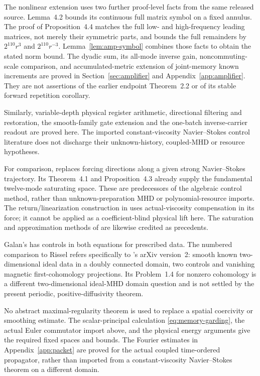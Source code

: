 \documentclass[11pt,a4paper]{amsart}
\theoremstyle{definition}
\theoremstyle{remark}
\numberwithin{equation}{section}
\begin{document}
The nonlinear extension uses two further proof-level facts from the same
released source. Lemma~4.2 bounds its continuous full matrix symbol on a
fixed annulus. The proof of Proposition~4.4 matches the full low- and
high-frequency leading matrices, not merely their symmetric parts, and
bounds the full remainders by $2^{110}r^3$ and $2^{110}r^{-3}$.
Lemma~\ref{lem:amp-symbol} combines those facts to obtain the stated norm
bound. The dyadic sum, its all-mode inverse gain, noncommuting-scale
comparison, and accumulated-metric extension of joint-memory known
increments are proved in Section~\ref{sec:amplifier} and
Appendix~\ref{app:amplifier}. They are not assertions of the earlier
endpoint Theorem~2.2 or of its stable forward repetition corollary.

Similarly, variable-depth physical register arithmetic, directional
filtering and restoration, the smooth-family gate extension and the
one-batch inverse-carrier readout are proved here. The imported
constant-viscosity Navier--Stokes control literature does not discharge
their unknown-history, coupled-MHD or resource hypotheses.

For comparison, \cite[Theorem~2.5]{Nersesyan2015} replaces forcing directions
along a given strong Navier--Stokes trajectory. Its Theorem~4.1 and
Proposition~4.3 already supply the fundamental twelve-mode saturating
space. These are predecessors of the algebraic control method, rather
than unknown-preparation MHD or polynomial-resource imports. The
return/linearization construction in \cite[Proposition~1.2]{Nersesyan21}
uses actual-viscosity compensation in its force; it cannot be applied as
a coefficient-blind physical lift here. The saturation and approximation
methods of \cite{AS2005,Shirikyan2006} are likewise credited as precedents.

Galan's \cite[Theorem~2.1]{Galan2011} has controls in both equations for
prescribed data. The numbered comparison to Rissel refers specifically
to \cite[Theorem~1.2]{Rissel}'s arXiv version~2: smooth known
two-dimensional ideal data in a doubly connected domain, two controls and
vanishing magnetic first-cohomology projections. Its Problem~1.4 for
nonzero cohomology is a different two-dimensional ideal-MHD domain question and is not
settled by the present periodic, positive-diffusivity theorem.

No abstract maximal-regularity theorem is used to replace a spatial
coercivity or smoothing estimate. The scalar-principal calculation
\eqref{eq:memory-garding}, the actual Euler commutator import above,
and the physical energy arguments give the required fixed spaces and
bounds. The Fourier estimates in Appendix~\ref{app:packet} are proved
for the actual coupled time-ordered propagator, rather than imported from
a constant-viscosity Navier--Stokes theorem on a different domain.
\end{document}
